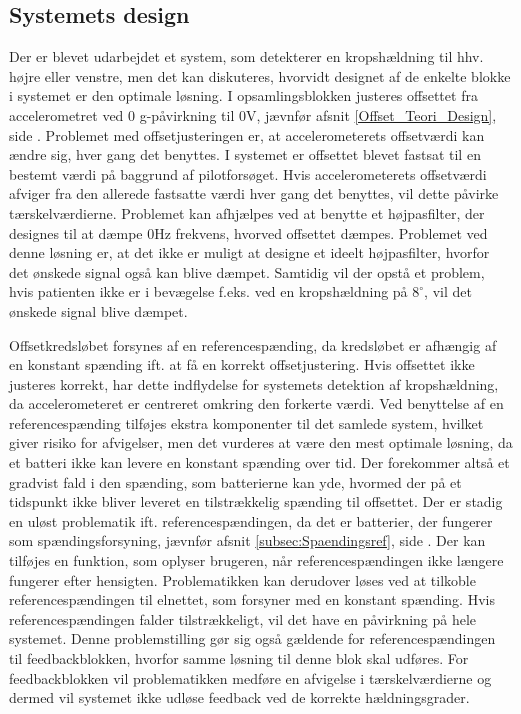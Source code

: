 \subsection{Systemets design}
Der er blevet udarbejdet et system, som detekterer en kropshældning til hhv. højre eller venstre, men det kan diskuteres, hvorvidt designet af de enkelte blokke i systemet er den optimale løsning. I opsamlingsblokken justeres offsettet fra accelerometret ved $0$ g-påvirkning til $0$V, jævnfør afsnit \ref{Offset_Teori_Design}, side \pageref{Offset_Teori_Design}. Problemet med offsetjusteringen er, at accelerometerets offsetværdi kan ændre sig, hver gang det benyttes. I systemet er offsettet blevet fastsat til en bestemt værdi på baggrund af pilotforsøget. Hvis accelerometerets offsetværdi afviger fra den allerede fastsatte værdi hver gang det benyttes, vil dette påvirke tærskelværdierne. Problemet kan afhjælpes ved at benytte et højpasfilter, der designes til at dæmpe $0$Hz frekvens, hvorved offsettet dæmpes. Problemet ved denne løsning er, at det ikke er muligt at designe et ideelt højpasfilter, hvorfor det ønskede signal også kan blive dæmpet. Samtidig vil der opstå et problem, hvis patienten ikke er i bevægelse f.eks. ved en kropshældning på $8^{\circ}$, vil det ønskede signal blive dæmpet. 

Offsetkredsløbet forsynes af en referencespænding, da kredsløbet er afhængig af en konstant spænding ift. at få en korrekt offsetjustering. Hvis offsettet ikke justeres korrekt, har dette indflydelse for systemets detektion af kropshældning, da accelerometeret er centreret omkring den forkerte værdi. Ved benyttelse af en referencespænding tilføjes ekstra komponenter til det samlede system, hvilket giver risiko for afvigelser, men det vurderes at være den mest optimale løsning, da et batteri ikke kan levere en konstant spænding over tid. Der forekommer altså et gradvist fald i den spænding, som batterierne kan yde, hvormed der på et tidspunkt ikke bliver leveret en tilstrækkelig spænding til offsettet. Der er stadig en uløst problematik ift. referencespændingen, da det er batterier, der fungerer som spændingsforsyning, jævnfør afsnit \ref{subsec:Spaendingsref}, side \pageref{subsec:Spaendingsref}. Der kan tilføjes en funktion, som oplyser brugeren, når referencespændingen ikke længere fungerer efter hensigten. Problematikken kan derudover løses ved at tilkoble referencespændingen til elnettet, som forsyner med en konstant spænding. Hvis referencespændingen falder tilstrækkeligt, vil det have en påvirkning på hele systemet. Denne problemstilling gør sig også gældende for referencespændingen til feedbackblokken, hvorfor samme løsning til denne blok skal udføres. For feedbackblokken vil problematikken medføre en afvigelse i tærskelværdierne og dermed vil systemet ikke udløse feedback ved de korrekte hældningsgrader. 

